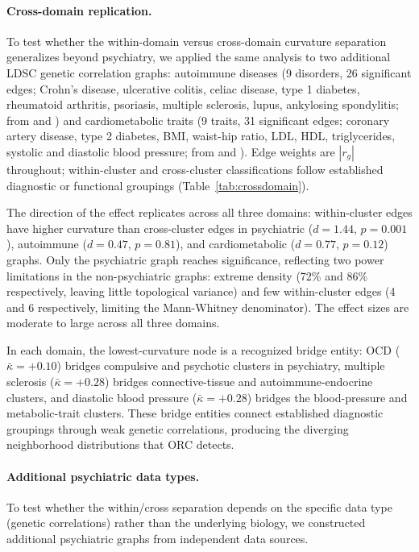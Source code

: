 \documentclass[11pt]{article}
\begin{document}
\paragraph{Cross-domain replication.} To test whether the within-domain versus cross-domain curvature separation generalizes beyond psychiatry, we applied the same analysis to two additional LDSC genetic correlation graphs: autoimmune diseases (9 disorders, 26 significant edges; Crohn's disease, ulcerative colitis, celiac disease, type 1 diabetes, rheumatoid arthritis, psoriasis, multiple sclerosis, lupus, ankylosing spondylitis; from \citealt{buliksullivan2015atlas} and \citealt{ellinghaus2016analysis}) and cardiometabolic traits (9 traits, 31 significant edges; coronary artery disease, type 2 diabetes, BMI, waist-hip ratio, LDL, HDL, triglycerides, systolic and diastolic blood pressure; from \citealt{buliksullivan2015atlas} and \citealt{evangelou2018genetic}). Edge weights are $|r_g|$ throughout; within-cluster and cross-cluster classifications follow established diagnostic or functional groupings (Table~\ref{tab:crossdomain}).

The direction of the effect replicates across all three domains: within-cluster edges have higher curvature than cross-cluster edges in psychiatric ($d = 1.44$, $p = 0.001$), autoimmune ($d = 0.47$, $p = 0.81$), and cardiometabolic ($d = 0.77$, $p = 0.12$) graphs. Only the psychiatric graph reaches significance, reflecting two power limitations in the non-psychiatric graphs: extreme density (72\% and 86\% respectively, leaving little topological variance) and few within-cluster edges (4 and 6 respectively, limiting the Mann-Whitney denominator). The effect sizes are moderate to large across all three domains.

In each domain, the lowest-curvature node is a recognized bridge entity: OCD ($\bar{\kappa} = +0.10$) bridges compulsive and psychotic clusters in psychiatry, multiple sclerosis ($\bar{\kappa} = +0.28$) bridges connective-tissue and autoimmune-endocrine clusters, and diastolic blood pressure ($\bar{\kappa} = +0.28$) bridges the blood-pressure and metabolic-trait clusters. These bridge entities connect established diagnostic groupings through weak genetic correlations, producing the diverging neighborhood distributions that ORC detects.

\paragraph{Additional psychiatric data types.} To test whether the within/cross separation depends on the specific data type (genetic correlations) rather than the underlying biology, we constructed additional psychiatric graphs from independent data sources.
\end{document}
